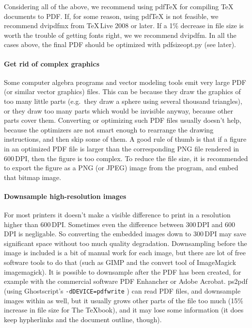 \documentclass{ltugproc}
\def\cmd{\textsf}
\begin{document}
Considering all of the above, we recommend using pdf\TeX{} for compiling
\TeX{} documents to PDF. If, for some
reason, using pdf\TeX{} is not feasible, we recommend \cmd{dvipdfmx} from
\TeX{}\,Live 2008 or later. If a 1\% decrease in file size is worth the
trouble of getting fonts right, we we recommend \cmd{dvipdfm}.
In all the cases above, the final PDF should be optimized with
\cmd{pdfsizeopt.py} (see later).

\paragraph{Get rid of complex graphics}

Some computer algebra programs and vector modeling tools emit very large
PDF (or similar vector graphics) files. This can be because they draw the
graphics of too many little parts (e.g.\ they draw a sphere using several
thousand triangles), or they draw too many parts which would
be invisible anyway, because other parts cover them. Converting or
optimizing such PDF files usually doesn't help, because the optimizers are not
smart enough to rearrange the drawing instructions, and then skip some of
them. A good rule of thumb is that if a figure in an optimized PDF file is
larger than the corresponding PNG file rendered in 600\,DPI, then the
figure is too complex. To reduce the file size, it is recommended to 
export the figure as a PNG (or JPEG) image from the program, and embed that
bitmap image.

\paragraph{Downsample high-resolution images}

For most printers it doesn't make a visible difference to print in a
resolution higher than 600\,DPI. Sometimes even the difference between
300\,DPI and 600\,DPI is negligable. So converting the embedded images down
to 300\,DPI may save significant space without too much quality degradation.
Downsampling before the image is included is a bit of manual work
for each image, but there are lot of free software tools to do that (such as
GIMP \cite{gimp} and the \cmd{convert} tool of ImageMagick \cmd{imagemagick}).
It is possible to downsample after the PDF has been created, for example
with the commercial software PDF Enhancher \cite{pdf-enhancer} or Adobe
Acrobat. \cmd{ps2pdf}
(using Ghostscript's \texttt{-dDEVICE=pdfwrite} \cite{pdfwrite-params}) can
read PDF files, and downsample images within as well, but it usually grows
other parts of the file too much (15\% increase in file size for The
\TeX{}book), and it may lose some information (it does
keep hypherlinks and the document outline, though).
\end{document}
